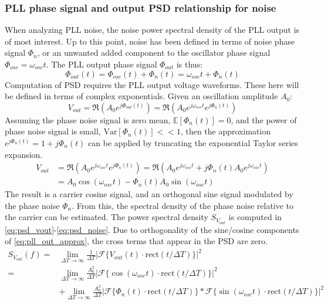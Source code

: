 \subsubsection{PLL phase signal and output PSD relationship for noise}\label{pn_noise_psd}
	When analyzing PLL noise, the noise power spectral density of the PLL output is of most interest. Up to this point, noise has been defined in terms of noise phase signal $\Phi_{n}$, or an unwanted added component to the oscillator phase signal $\Phi_{osc}=\omega_{osc}t$. The PLL output phase signal $\Phi_{out}$ is thus:
	\begin{equation}
		\Phi_{out}(t) = \Phi_{osc}(t) + \Phi_{n}(t) = \omega_{osc}t + \Phi_{n}(t) 
	\end{equation}
	Computation of PSD requires the PLL output voltage waveforms. These here will be defined in terms of complex exponentials. Given an oscillation amplitude $A_0$:
	\begin{equation}
		V_{out} = \Re\left(A_0e^{j\Phi_{out}(t)}\right) = \Re\left(A_0e^{j\omega_{osc}t}e^{j\Phi_{n}(t)}\right)
	\end{equation}
	Assuming the phase noise signal is zero mean, $\mathbb{E}[\Phi_{n}(t)]=0$, and the power of phase noise signal is small, $\mathrm{Var}[\Phi_{n}(t)] << 1$, then the approximation $e^{j\Phi_{n}(t)} = 1 + j\Phi_{n}(t)$ can be applied by truncating the exponential Taylor series expansion.
	\begin{align}
		V_{out} &= \Re\left(A_0e^{j\omega_{osc}t}e^{j\Phi_{n}(t)}\right) = \Re\left(A_0e^{j\omega_{osc}t} +j\Phi_{n}(t)A_0e^{j\omega_{osc}t}\right)\\
		&= A_0\cos(\omega_{osc}t) - \Phi_{n}(t)A_0\sin(\omega_{osc}t) \label{eq:pll_out_approx}
	\end{align}
	The result is a carrier cosine signal, and an orthogonal sine signal modulated by the phase noise $\Phi_{n}$. From this, the spectral density of the phase noise relative to the carrier can be estimated. The power spectral density $S_{V_{out}}$ is computed in \ref{eq:psd_vout}-\ref{eq:psd_noise}. Due to orthogonality of the sine/cosine components of \ref{eq:pll_out_approx}, the cross terms that appear in the PSD are zero. 
	\begin{align}
		S_{V_{out}}(f) =& \lim_{\Delta T\rightarrow\infty}\frac{1}{\Delta T}|\mathcal{F}\{V_{out}(t)\cdot\mathrm{rect}(t/\Delta T)\}|^2 \label{eq:psd_vout}\\
		=&\lim_{\Delta T\rightarrow\infty}\frac{A_0^2}{\Delta T}|\mathcal{F}\{\cos(\omega_{osc}t)\cdot\mathrm{rect}(t/\Delta T)\}|^2 \label{eq:psd_carrier}\\ 
		&+ \lim_{\Delta T\rightarrow\infty}\frac{A_0^2}{\Delta T}|\mathcal{F}\{\Phi_{n}(t)\cdot\mathrm{rect}(t/\Delta T)\}*\mathcal{F}\{\sin(\omega_{osc}t)\cdot\mathrm{rect}(t/\Delta T)\}|^2 \label{eq:psd_noise}
	\end{align}
